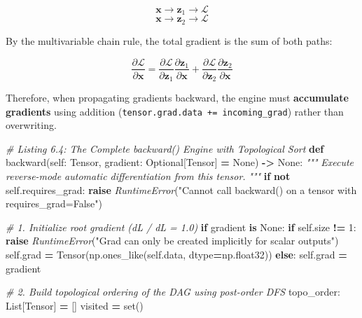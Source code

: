 \documentclass[
  letterpaper,
]{scrbook}
\newenvironment{Shaded}{\begin{snugshade}}{\end{snugshade}}
\newcommand{\BuiltInTok}[1]{#1}
\newcommand{\CommentTok}[1]{\textcolor[rgb]{0.56,0.35,0.01}{\textit{#1}}}
\newcommand{\ControlFlowTok}[1]{\textcolor[rgb]{0.13,0.29,0.53}{\textbf{#1}}}
\newcommand{\DecValTok}[1]{\textcolor[rgb]{0.00,0.00,0.81}{#1}}
\newcommand{\KeywordTok}[1]{\textcolor[rgb]{0.13,0.29,0.53}{\textbf{#1}}}
\newcommand{\NormalTok}[1]{#1}
\newcommand{\OperatorTok}[1]{\textcolor[rgb]{0.81,0.36,0.00}{\textbf{#1}}}
\newcommand{\PreprocessorTok}[1]{\textcolor[rgb]{0.56,0.35,0.01}{\textit{#1}}}
\newcommand{\StringTok}[1]{\textcolor[rgb]{0.31,0.60,0.02}{#1}}
\newcommand{\VariableTok}[1]{\textcolor[rgb]{0.00,0.00,0.00}{#1}}
\begin{document}
\[\mathbf{x} \longrightarrow \mathbf{z}_1 \longrightarrow \mathcal{L}\]
\[\mathbf{x} \longrightarrow \mathbf{z}_2 \longrightarrow \mathcal{L}\]

By the multivariable chain rule, the total gradient is the sum of both
paths:

\[\frac{\partial \mathcal{L}}{\partial \mathbf{x}} = \frac{\partial \mathcal{L}}{\partial \mathbf{z}_1} \frac{\partial \mathbf{z}_1}{\partial \mathbf{x}} + \frac{\partial \mathcal{L}}{\partial \mathbf{z}_2} \frac{\partial \mathbf{z}_2}{\partial \mathbf{x}}\]

Therefore, when propagating gradients backward, the engine must
\textbf{accumulate gradients} using addition
(\texttt{tensor.grad.data\ +=\ incoming\_grad}) rather than overwriting.

\begin{Shaded}
\begin{Highlighting}[]
\CommentTok{\# Listing 6.4: The Complete backward() Engine with Topological Sort}
\KeywordTok{def}\NormalTok{ backward(}\VariableTok{self}\NormalTok{: Tensor, gradient: Optional[Tensor] }\OperatorTok{=} \VariableTok{None}\NormalTok{) }\OperatorTok{{-}\textgreater{}} \VariableTok{None}\NormalTok{:}
    \CommentTok{"""}
\CommentTok{    Execute reverse{-}mode automatic differentiation from this tensor.}
\CommentTok{    """}
    \ControlFlowTok{if} \KeywordTok{not} \VariableTok{self}\NormalTok{.requires\_grad:}
        \ControlFlowTok{raise} \PreprocessorTok{RuntimeError}\NormalTok{(}\StringTok{"Cannot call backward() on a tensor with requires\_grad=False"}\NormalTok{)}

    \CommentTok{\# 1. Initialize root gradient (dL / dL = 1.0)}
    \ControlFlowTok{if}\NormalTok{ gradient }\KeywordTok{is} \VariableTok{None}\NormalTok{:}
        \ControlFlowTok{if} \VariableTok{self}\NormalTok{.size }\OperatorTok{!=} \DecValTok{1}\NormalTok{:}
            \ControlFlowTok{raise} \PreprocessorTok{RuntimeError}\NormalTok{(}\StringTok{"Grad can only be created implicitly for scalar outputs"}\NormalTok{)}
        \VariableTok{self}\NormalTok{.grad }\OperatorTok{=}\NormalTok{ Tensor(np.ones\_like(}\VariableTok{self}\NormalTok{.data, dtype}\OperatorTok{=}\NormalTok{np.float32))}
    \ControlFlowTok{else}\NormalTok{:}
        \VariableTok{self}\NormalTok{.grad }\OperatorTok{=}\NormalTok{ gradient}

    \CommentTok{\# 2. Build topological ordering of the DAG using post{-}order DFS}
\NormalTok{    topo\_order: List[Tensor] }\OperatorTok{=}\NormalTok{ []}
\NormalTok{    visited }\OperatorTok{=} \BuiltInTok{set}\NormalTok{()}


\end{Highlighting}
\end{Shaded}
\end{document}
